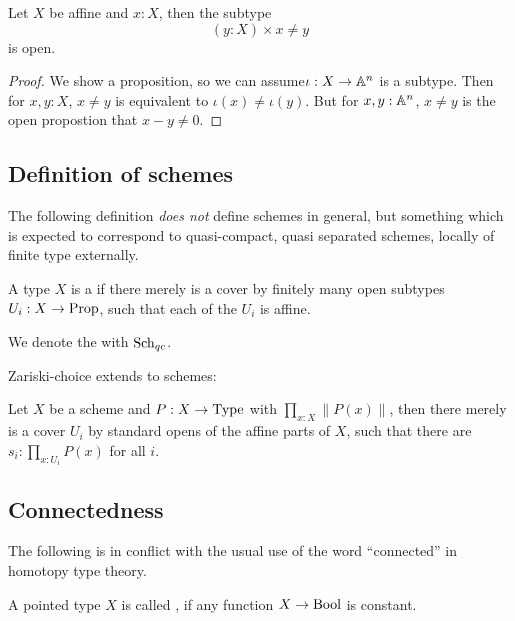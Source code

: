 \begin{lemma}%
  Let $X$ be affine and $x:X$, then the subtype
  \[ (y:X)\times x\neq y \]
  is open.
\end{lemma}

\begin{proof}
  We show a proposition, so we can assume$\iota: X\to \mathbb{A}^n$ is a subtype.
  Then for $x,y:X$, $x\neq y$ is equivalent to $\iota(x)\neq\iota(y)$.
  But for $x,y:\mathbb{A}^n$, $x\neq y$ is the open propostion that $x-y\neq 0$.
\end{proof}


\subsection{Definition of schemes}
The following definition \emph{does not} define schemes in general,
but something which is expected to correspond to quasi-compact, quasi separated schemes,
locally of finite type externally.

\begin{definition}%
  \label{def:schemes}
  A type $X$ is a 
  if there merely is a cover by finitely many open subtypes $U_i:X\to\mathrm{Prop}$,
  such that each of the $U_i$ is affine.
\end{definition}

\begin{definition}
  \label{def:type-of-schemes}
  We denote the  with $\mathrm{Sch}_{qc}$.
\end{definition}

Zariski-choice  extends to schemes:

\begin{proposition}%
  Let $X$ be a scheme and $P:X\to \mathrm{Type}$ with $\prod_{x:X}\|P(x)\|$,
  then there merely is a cover $U_i$ by standard opens of the affine parts of $X$,
  such that there are $s_i:\prod_{x:U_i}P(x)$ for all $i$.
\end{proposition}

\subsection{Connectedness}
The following is in conflict with the usual use of the word ``connected'' in homotopy type theory.

\begin{definition}%
  \label{def:connected}
  A pointed type $X$ is called ,
  if any function $X\to \mathrm{Bool}$ is constant.
\end{definition}

